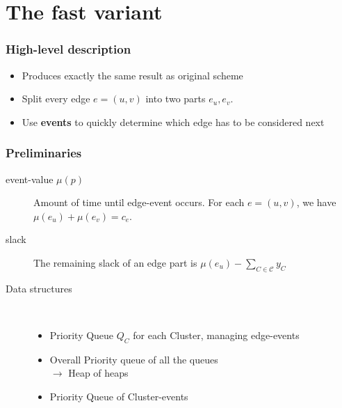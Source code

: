 \documentclass[11pt]{beamer}
\begin{document}
\begin{frame}
\end{frame}

\section{The fast variant}

\begin{frame} 
	\frametitle{High-level description}
	\begin{itemize}
		\item Produces exactly the same result as original scheme
		\item Split every edge $e=(u,v)$ into two parts $e_u, e_v$.
		\item Use \textbf{events} to quickly determine which edge has to be considered next
	\end{itemize}
\end{frame}

\begin{frame} 
	\frametitle{Preliminaries}
	\begin{description}
		\item[event-value $\mu(p)$] Amount of time until edge-event occurs. For each $e=(u,v)$, we have $\mu(e_u)+\mu(e_v) = c_e$.
		\item[slack] The remaining slack of an edge part is	$\mu(e_u) - \sum_{C \in \mathcal{C}} y_C$
		\item[Data structures] \ \\
		\begin{itemize}
			\item Priority Queue $Q_C$ for each Cluster, managing edge-events
			\item Overall Priority queue of all the queues \\
			$\rightarrow$ Heap of heaps
			\item Priority Queue of Cluster-events
		\end{itemize}
	\end{description}
\end{frame}
\end{document}
